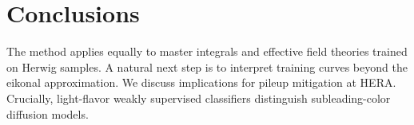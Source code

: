 \section{Conclusions}\label{sec:conclusions}

The method applies equally to master integrals and effective field
theories trained on Herwig samples. A natural next step is to interpret
training curves beyond the eikonal approximation. We discuss
implications for pileup mitigation at HERA. Crucially, light-flavor
weakly supervised classifiers distinguish subleading-color diffusion
models.

